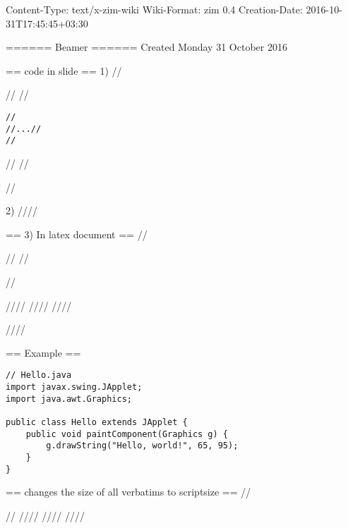 Content-Type: text/x-zim-wiki
Wiki-Format: zim 0.4
Creation-Date: 2016-10-31T17:45:45+03:30

====== Beamer ======
Created Monday 31 October 2016

== code in slide ==
1)
//\begin{frame}[fragile]//
//\begin{verbatim}//
//...//
//\end{verbatim}//
//\end{frame}//

2)
////

== 3) In latex document ==
//\usepackage{listings}//
//\usepackage{color}//

////
////
////

////

== Example ==
\begin{lstlisting}
// Hello.java
import javax.swing.JApplet;
import java.awt.Graphics;

public class Hello extends JApplet {
	public void paintComponent(Graphics g) {
		g.drawString("Hello, world!", 65, 95);
	}    
}
\end{lstlisting}

== changes the size of all verbatims to scriptsize ==
//\usepackage{verbatim}//
//\makeatletter//
//\def\verbatim@font{\scriptsize\ttfamily}//
//\makeatother//



